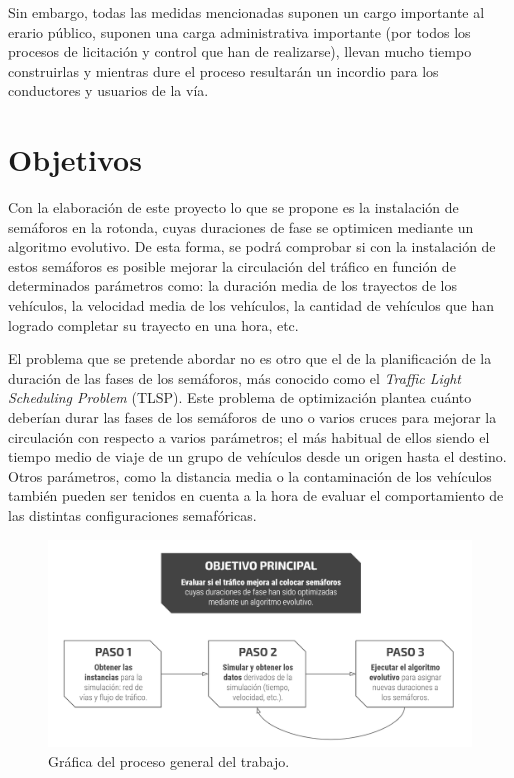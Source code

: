 Sin embargo, todas las medidas mencionadas suponen un cargo importante al erario público, suponen una carga administrativa importante (por todos los procesos de licitación y control que han de realizarse), llevan mucho tiempo construirlas y mientras dure el proceso resultarán un incordio para los conductores y usuarios de la vía.


\section{Objetivos}

Con la elaboración de este proyecto lo que se propone es la instalación de semáforos en la rotonda, cuyas duraciones de fase se optimicen mediante un algoritmo evolutivo. De esta forma, se podrá comprobar si con la instalación de estos semáforos es posible mejorar la circulación del tráfico en función de determinados parámetros como: la duración media de los trayectos de los vehículos, la velocidad media de los vehículos, la cantidad de vehículos que han logrado completar su trayecto en una hora, etc.

El problema que se pretende abordar no es otro que el de la planificación de la duración de las fases de los semáforos, más conocido como el \textit{Traffic Light Scheduling Problem} (TLSP). Este problema de optimización plantea cuánto deberían durar las fases de los semáforos de uno o varios cruces para mejorar la circulación con respecto a varios parámetros; el más habitual de ellos siendo el tiempo medio de viaje de un grupo de vehículos desde un origen hasta el destino. Otros parámetros, como la distancia media o la contaminación de los vehículos también pueden ser tenidos en cuenta a la hora de evaluar el comportamiento de las distintas configuraciones semafóricas.

\begin{figure}[!t]
    \centering
    \includegraphics[width=\textwidth]{report/images/evolutionary_alg_graph.png}
    \caption{Gráfica del proceso general del trabajo.}
    \label{fig:evolutionary_alg_graph}
\end{figure}

